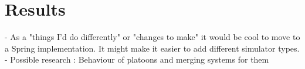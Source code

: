 \chapter{Results}
\label{cha:Results}
- As a "things I'd do differently" or "changes to make" it would be cool to move to a Spring implementation. It might make it easier to add different simulator types.
- Possible research : Behaviour of platoons and merging systems for them